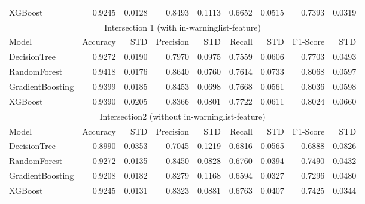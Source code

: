 \documentclass[11pt]{article}
\begin{document}
\begin{tabular}{l|rr|rr|rr|rr}
	XGBoost & 0.9245 & 0.0128 & 0.8493 & 0.1113 & 0.6652 & 0.0515 & 0.7393 & 0.0319 \\
	\multicolumn{9}{c}{Intersection 1 (with in-warninglist-feature)}\\
	Model & Accuracy & STD & Precision & STD & Recall & STD & F1-Score & STD \\
	\hline
	DecisionTree & 0.9272 & 0.0190 & 0.7970 & 0.0975 & 0.7559 & 0.0606 & 0.7703 & 0.0493 \\
	RandomForest  & 0.9418 & 0.0176 & 0.8640 & 0.0760 & 0.7614 & 0.0733 & 0.8068 & 0.0597 \\
	GradientBoosting & 0.9399 & 0.0185 & 0.8453 & 0.0698 & 0.7668 & 0.0561 & 0.8036 & 0.0598 \\
	XGBoost & 0.9390 & 0.0205 & 0.8366 & 0.0801 & 0.7722 & 0.0611 & 0.8024 & 0.0660 \\
	\multicolumn{9}{c}{Intersection2 (without in-warninglist-feature)}\\
	Model & Accuracy & STD & Precision & STD & Recall & STD & F1-Score & STD \\
	\hline
	DecisionTree  & 0.8990 & 0.0353 & 0.7045 & 0.1219 & 0.6816 & 0.0565 & 0.6888 & 0.0826 \\
	RandomForest  & 0.9272 & 0.0135 & 0.8450 & 0.0828 & 0.6760 & 0.0394 & 0.7490 & 0.0432 \\
	GradientBoosting & 0.9208 & 0.0182 & 0.8279 & 0.1168 & 0.6594 & 0.0327 & 0.7296 & 0.0480 \\
	XGBoost & 0.9245 & 0.0131 & 0.8323 & 0.0881 & 0.6763 & 0.0407 & 0.7425 & 0.0344 \\
\end{tabular}
\end{document}

